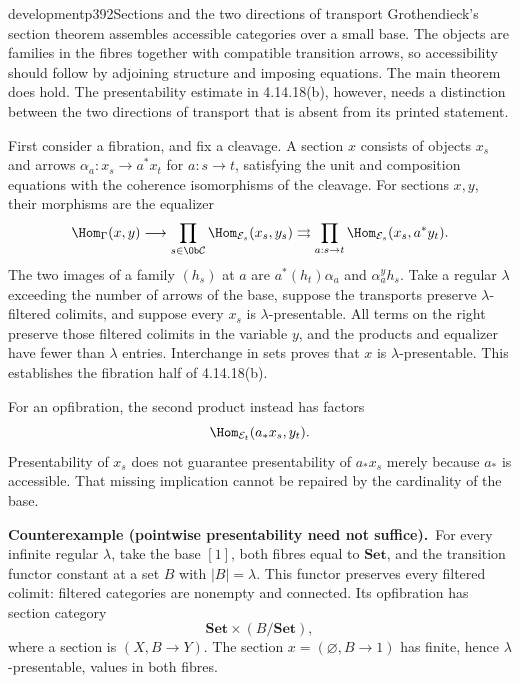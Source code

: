 \begin{dcomment}{development}{p392}{Sections and the two directions of transport}
Grothendieck's section theorem assembles accessible categories over a small base. The objects are families in the fibres together with compatible transition arrows, so accessibility should follow by adjoining structure and imposing equations. The main theorem does hold. The presentability estimate in 4.14.18(b), however, needs a distinction between the two directions of transport that is absent from its printed statement.

First consider a fibration, and fix a cleavage. A section $x$ consists of objects $x_s$ and arrows $\alpha_a:x_s\to a^*x_t$ for $a:s\to t$, satisfying the unit and composition equations with the coherence isomorphisms of the cleavage. For sections $x,y$, their morphisms are the equalizer
\[
 \Hom_{\Gamma}(x,y)\longrightarrow
 \prod_{s\in\Ob\mathcal C}\Hom_{\mathcal E_s}(x_s,y_s)
 \rightrightarrows
 \prod_{a:s\to t}\Hom_{\mathcal E_s}(x_s,a^*y_t).
\]
The two images of a family $(h_s)$ at $a$ are $a^*(h_t)\alpha_a$ and $\alpha_a^y h_s$. Take a regular $\lambda$ exceeding the number of arrows of the base, suppose the transports preserve $\lambda$-filtered colimits, and suppose every $x_s$ is $\lambda$-presentable. All terms on the right preserve those filtered colimits in the variable $y$, and the products and equalizer have fewer than $\lambda$ entries. Interchange in sets proves that $x$ is $\lambda$-presentable. This establishes the fibration half of 4.14.18(b).

For an opfibration, the second product instead has factors
\[
 \Hom_{\mathcal E_t}(a_*x_s,y_t).
\]
Presentability of $x_s$ does not guarantee presentability of $a_*x_s$ merely because $a_*$ is accessible. That missing implication cannot be repaired by the cardinality of the base.

\textbf{Counterexample (pointwise presentability need not suffice).}\ours\ 
For every infinite regular $\lambda$, take the base $[1]$, both fibres equal to $\mathbf{Set}$, and the transition functor constant at a set $B$ with $|B|=\lambda$. This functor preserves every filtered colimit: filtered categories are nonempty and connected. Its opfibration has section category
\[
 \mathbf{Set}\times(B/\mathbf{Set}),
\]
where a section is $(X,B\to Y)$. The section $x=(\varnothing,B\to1)$ has finite, hence $\lambda$-presentable, values in both fibres.


\end{dcomment}
